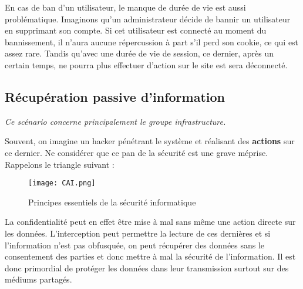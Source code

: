 En cas de ban d'un utilisateur, le manque de durée de vie est aussi problématique. Imaginons qu'un administrateur décide de bannir un utilisateur en supprimant son compte. Si cet utilisateur est connecté au moment du bannissement, il n'aura aucune répercussion à part s'il perd son cookie, ce qui est assez rare. Tandis qu'avec une durée de vie de session, ce dernier, après un certain temps, ne pourra plus effectuer d'action sur le site est sera déconnecté.


\subsection{Récupération passive d'information}

\emph{Ce scénario concerne principalement le groupe infrastructure.}
\medskip

Souvent, on imagine un hacker pénétrant le système et réalisant des \textbf{actions} sur ce dernier. Ne considérer que ce pan de la sécurité est une grave méprise. Rappelons le triangle suivant :

\begin{figure}[h]
\begin{center}
\texttt{[image: CAI.png]}
\caption{Principes essentiels de la sécurité informatique}
\label{cia}
\end{center}
\end{figure}

La confidentialité peut en effet être mise à mal sans même une action directe sur les données. L'interception peut permettre la lecture de ces dernières et si l'information n'est pas obfusquée, on peut récupérer des données sans le consentement des parties et donc mettre à mal la sécurité de l'information. Il est donc primordial de protéger les données dans leur transmission surtout sur des médiums partagés.
\medskip

